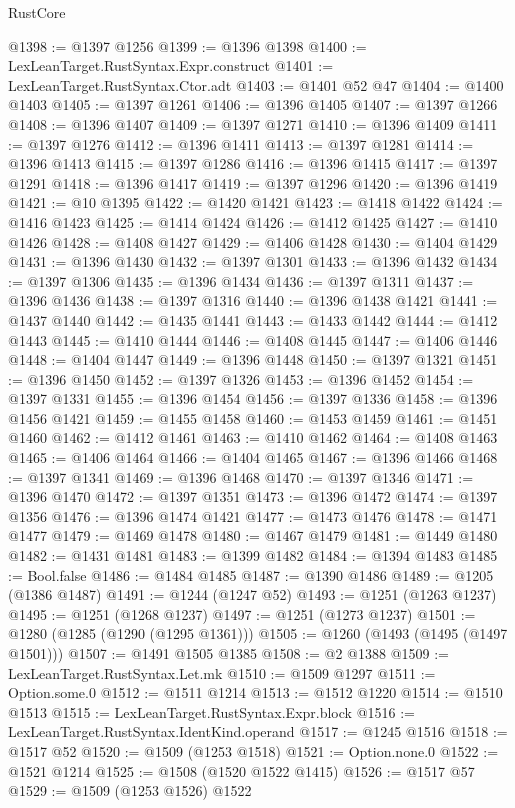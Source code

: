 \begin{lexlean}{RustCore}
\begin{coremodule}
@1398 := @1397 @1256
@1399 := @1396 @1398
@1400 := LexLeanTarget.RustSyntax.Expr.construct
@1401 := LexLeanTarget.RustSyntax.Ctor.adt
@1403 := @1401 @52 @47
@1404 := @1400 @1403
@1405 := @1397 @1261
@1406 := @1396 @1405
@1407 := @1397 @1266
@1408 := @1396 @1407
@1409 := @1397 @1271
@1410 := @1396 @1409
@1411 := @1397 @1276
@1412 := @1396 @1411
@1413 := @1397 @1281
@1414 := @1396 @1413
@1415 := @1397 @1286
@1416 := @1396 @1415
@1417 := @1397 @1291
@1418 := @1396 @1417
@1419 := @1397 @1296
@1420 := @1396 @1419
@1421 := @10 @1395
@1422 := @1420 @1421
@1423 := @1418 @1422
@1424 := @1416 @1423
@1425 := @1414 @1424
@1426 := @1412 @1425
@1427 := @1410 @1426
@1428 := @1408 @1427
@1429 := @1406 @1428
@1430 := @1404 @1429
@1431 := @1396 @1430
@1432 := @1397 @1301
@1433 := @1396 @1432
@1434 := @1397 @1306
@1435 := @1396 @1434
@1436 := @1397 @1311
@1437 := @1396 @1436
@1438 := @1397 @1316
@1440 := @1396 @1438 @1421
@1441 := @1437 @1440
@1442 := @1435 @1441
@1443 := @1433 @1442
@1444 := @1412 @1443
@1445 := @1410 @1444
@1446 := @1408 @1445
@1447 := @1406 @1446
@1448 := @1404 @1447
@1449 := @1396 @1448
@1450 := @1397 @1321
@1451 := @1396 @1450
@1452 := @1397 @1326
@1453 := @1396 @1452
@1454 := @1397 @1331
@1455 := @1396 @1454
@1456 := @1397 @1336
@1458 := @1396 @1456 @1421
@1459 := @1455 @1458
@1460 := @1453 @1459
@1461 := @1451 @1460
@1462 := @1412 @1461
@1463 := @1410 @1462
@1464 := @1408 @1463
@1465 := @1406 @1464
@1466 := @1404 @1465
@1467 := @1396 @1466
@1468 := @1397 @1341
@1469 := @1396 @1468
@1470 := @1397 @1346
@1471 := @1396 @1470
@1472 := @1397 @1351
@1473 := @1396 @1472
@1474 := @1397 @1356
@1476 := @1396 @1474 @1421
@1477 := @1473 @1476
@1478 := @1471 @1477
@1479 := @1469 @1478
@1480 := @1467 @1479
@1481 := @1449 @1480
@1482 := @1431 @1481
@1483 := @1399 @1482
@1484 := @1394 @1483
@1485 := Bool.false
@1486 := @1484 @1485
@1487 := @1390 @1486
@1489 := @1205 (@1386 @1487)
@1491 := @1244 (@1247 @52)
@1493 := @1251 (@1263 @1237)
@1495 := @1251 (@1268 @1237)
@1497 := @1251 (@1273 @1237)
@1501 := @1280 (@1285 (@1290 (@1295 @1361)))
@1505 := @1260 (@1493 (@1495 (@1497 @1501)))
@1507 := @1491 @1505 @1385
@1508 := @2 @1388
@1509 := LexLeanTarget.RustSyntax.Let.mk
@1510 := @1509 @1297
@1511 := Option.some.{0}
@1512 := @1511 @1214
@1513 := @1512 @1220
@1514 := @1510 @1513
@1515 := LexLeanTarget.RustSyntax.Expr.block
@1516 := LexLeanTarget.RustSyntax.IdentKind.operand
@1517 := @1245 @1516
@1518 := @1517 @52
@1520 := @1509 (@1253 @1518)
@1521 := Option.none.{0}
@1522 := @1521 @1214
@1525 := @1508 (@1520 @1522 @1415)
@1526 := @1517 @57
@1529 := @1509 (@1253 @1526) @1522

\end{coremodule}
\end{lexlean}
